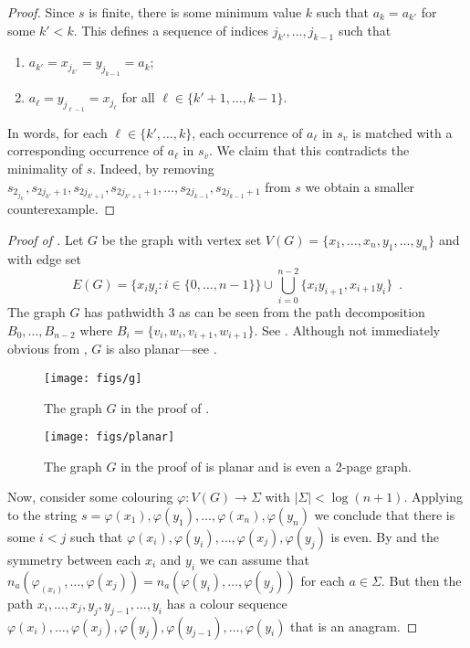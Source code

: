 \documentclass{patmorin}
\begin{document}
\begin{proof}
  Since $s$ is finite, there is some minimum value $k$ such that
  $a_{k}=a_{k'}$ for some $k' < k$.  This defines a sequence of indices
  $j_{k'},\ldots,j_{k-1}$ such that
  \begin{enumerate}
     \item $a_{k'}=x_{j_{k'}}=y_{j_{k-1}}=a_{k}$; 
     \item $a_{\ell}=y_{j_{\ell-1}}=x_{j_\ell}$ for all $\ell\in\{k'+1,\ldots,k-1\}$.
  \end{enumerate}
  In words, for each $\ell\in\{k',\ldots,k\}$, each occurrence of $a_\ell$ in $s_v$ is matched with a corresponding
  occurrence of $a_\ell$ in $s_{\overline{v}}$.
  We claim that this contradicts
  the minimality of $s$. Indeed, by removing
  $s_{2_{j_{k'}}},s_{2j_{k'}+1},s_{2j_{k'+1}},s_{2j_{k'+1}+1},\ldots,s_{2j_{k-1}},s_{2j_{k-1}+1}$
  from $s$ we obtain a smaller counterexample.
\end{proof}

\begin{proof}[Proof of ]
Let $G$ be the graph with vertex set
$V(G)=\{x_1,\ldots,x_{n},y_1,\ldots,y_{n}\}$ and with edge set
\[
  E(G) = \{x_iy_i : i\in\{0,\ldots,n-1\}\} \cup \bigcup_{i=0}^{n-2} \{x_iy_{i+1},x_{i+1}y_i\} \enspace .
\]
The graph $G$ has pathwidth 3 as can be seen from the path decomposition $B_0,\ldots,B_{n-2}$ where $B_i=\{v_i,w_i,v_{i+1},w_{i+1}\}$.
See . Although not immediately obvious from , $G$ is also planar---see .

\begin{figure}
  \begin{center}
    \texttt{[image: figs/g]}
  \end{center}
  \caption{The graph $G$ in the proof of .}
\end{figure}

\begin{figure}
  \begin{center}
    \texttt{[image: figs/planar]}
  \end{center}
  \caption{The graph $G$ in the proof of  is planar
   and is even a 2-page graph.}
\end{figure}


Now, consider some colouring $\varphi:V(G)\to\Sigma$
with $|\Sigma| < \log(n+1)$.  Applying  to
the string 
$s=\varphi(x_1),\varphi(y_1),\ldots,\varphi(x_n),\varphi(y_n)$ we
conclude that there is some $i < j$ such that 
$\varphi(x_{i}),\varphi(y_i),\ldots,\varphi(x_j),\varphi(y_j)$
is even.  By  and the
symmetry between each $x_i$ and $y_i$ we can assume that
$n_a(\varphi_(x_i),\ldots,\varphi(x_j))=n_a(\varphi(y_i),\ldots,\varphi(y_j))$
for each $a\in\Sigma$.  But then the path
$x_i,\ldots,x_j,y_j,y_{j-1},\ldots,y_i$ has a colour sequence
$\varphi(x_i),\ldots,\varphi(x_j),\varphi(y_j),\varphi(y_{j-1}),\ldots,\varphi(y_i)$
that is an anagram.
\end{proof}
\end{document}

